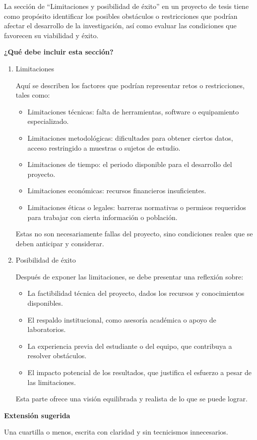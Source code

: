 La sección de ``Limitaciones y posibilidad de éxito'' en un proyecto de tesis tiene como propósito identificar los posibles obstáculos o restricciones que podrían afectar el desarrollo de la investigación, así como evaluar las condiciones que favorecen su viabilidad y éxito.

\textbf{¿Qué debe incluir esta sección?}

\begin{enumerate}
    \item Limitaciones
    
    Aquí se describen los factores que podrían representar retos o restricciones, tales como:

    \begin{itemize}
        \item Limitaciones técnicas: falta de herramientas, software o equipamiento especializado.
        \item Limitaciones metodológicas: dificultades para obtener ciertos datos, acceso restringido a muestras o sujetos de estudio.
        \item Limitaciones de tiempo: el periodo disponible para el desarrollo del proyecto.
        \item Limitaciones económicas: recursos financieros insuficientes.
        \item Limitaciones éticas o legales: barreras normativas o permisos requeridos para trabajar con cierta información o población.
    \end{itemize}

    Estas no son necesariamente fallas del proyecto, sino condiciones reales que se deben anticipar y considerar.

    \item Posibilidad de éxito
    
    Después de exponer las limitaciones, se debe presentar una reflexión sobre:
    \begin{itemize}
        \item La factibilidad técnica del proyecto, dados los recursos y conocimientos disponibles.
        \item El respaldo institucional, como asesoría académica o apoyo de laboratorios.
        \item La experiencia previa del estudiante o del equipo, que contribuya a resolver obstáculos.
        \item El impacto potencial de los resultados, que justifica el esfuerzo a pesar de las limitaciones.
    \end{itemize}

    Esta parte ofrece una visión equilibrada y realista de lo que se puede lograr.
\end{enumerate}


\textbf{Extensión sugerida}

Una cuartilla o menos, escrita con claridad y sin tecnicismos innecesarios.